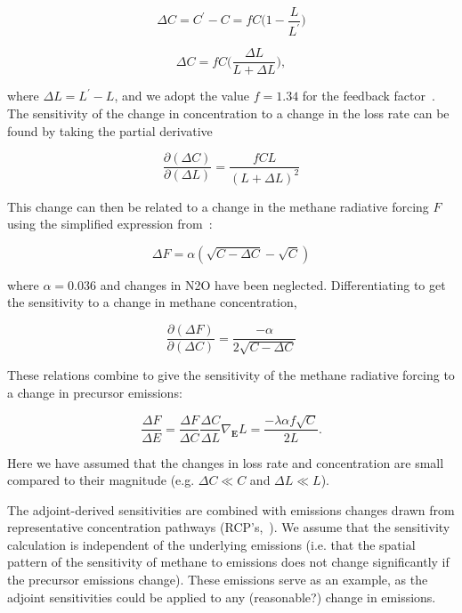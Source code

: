 \begin{equation}
\Delta C = C^{\prime} - C = f C \Big(1 - \frac{L}{L^{\prime}}\Big)
\end{equation}

\begin{equation}
\Delta C = fC\Big(\frac{\Delta L}{L+\Delta L}\Big),
\end{equation}

where $\Delta L = L^{\prime}-L$, and we adopt the value $f=1.34$ for the feedback factor~\citep{ref:holmes2013}. The sensitivity of the change in concentration to a change in the loss rate can be found by taking the partial derivative

\begin{equation}
\frac{\partial (\Delta C)}{\partial (\Delta L)} = \frac{fCL}{(L+\Delta L)^2}
\end{equation}

This change can then be related to a change in the methane radiative forcing $F$ using the simplified expression from~\citet{ref:myhre1998}:

\begin{equation}
\Delta F = \alpha (\sqrt{C-\Delta C} - \sqrt{C})
\end{equation}

where $\alpha=0.036$ and changes in N2O have been neglected. Differentiating to get the sensitivity to a change in methane concentration,

\begin{equation}
\frac{\partial (\Delta F)}{\partial (\Delta C)} = \frac{-\alpha}{2\sqrt{C-\Delta C}}
\end{equation}

These relations combine to give the sensitivity of the methane radiative forcing to a change in precursor emissions:

\begin{equation}
\frac{\Delta F}{\Delta E} = \frac{\Delta F}{\Delta C} \frac{\Delta C}{\Delta L} \nabla_{\mathbf{E}} L = \frac{-\lambda \alpha f \sqrt{C}}{2L}.
\end{equation}

Here we have assumed that the changes in loss rate and concentration are small compared to their magnitude (e.g. $\Delta C \ll C$ and $\Delta L \ll L$).

The adjoint-derived sensitivities are combined with emissions changes drawn from representative concentration pathways (RCP's,~\citet{ref:vanvuuren2011}). We assume that the sensitivity calculation is independent of the underlying emissions (i.e. that the spatial pattern of the sensitivity of methane to emissions does not change significantly if the precursor emissions change). These emissions serve as an example, as the adjoint sensitivities could be applied to any (reasonable?) change in emissions.